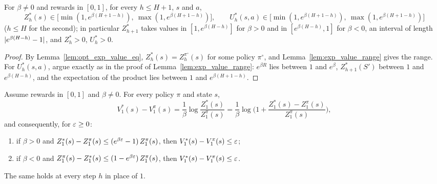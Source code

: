 \begin{lemma}\label{lem:opt_exp_value_range}
\leanok
{}
For $\beta \ne 0$ and rewards in $[0, 1]$, for every $h \le H + 1$, $s$ and $a$,
\[
  Z^*_h(s) \in \big[\min(1, e^{\beta(H + 1 - h)}),\ \max(1, e^{\beta(H + 1 - h)})\big],
  \qquad
  U^*_h(s, a) \in \big[\min(1, e^{\beta(H + 1 - h)}),\ \max(1, e^{\beta(H + 1 - h)})\big]
\]
($h \le H$ for the second); in particular $Z^*_{h+1}$ takes values in $[1, e^{\beta(H - h)}]$
for $\beta > 0$ and in $[e^{\beta(H - h)}, 1]$ for $\beta < 0$, an interval of length
$\lvert e^{\beta(H - h)} - 1 \rvert$, and $Z^*_h > 0$, $U^*_h > 0$.
\end{lemma}

\begin{proof}
\leanok
By Lemma~\ref{lem:opt_exp_value_eq}, $Z^*_h(s) = Z^{\pi^\circ}_h(s)$ for some policy $\pi^\circ$, and
Lemma~\ref{lem:exp_value_range} gives the range. For $U^*_h(s, a)$, argue exactly as in the proof
of Lemma~\ref{lem:exp_value_range}: $e^{\beta R}$ lies between $1$ and $e^{\beta}$, $Z^*_{h+1}(S')$
between $1$ and $e^{\beta(H - h)}$, and the expectation of the product lies between $1$ and
$e^{\beta(H + 1 - h)}$.
\end{proof}

\begin{lemma}\label{lem:value_gap_log}
\leanok
{}
Assume rewards in $[0, 1]$ and $\beta \ne 0$. For every policy $\pi$ and state $s$,
\[
  V^*_1(s) - V^\pi_1(s) = \frac1\beta \log \frac{Z^*_1(s)}{Z^\pi_1(s)}
  = \frac1\beta \log\Big(1 + \frac{Z^*_1(s) - Z^\pi_1(s)}{Z^\pi_1(s)}\Big) ,
\]
and consequently, for $\varepsilon \ge 0$:
\begin{enumerate}
  \item[(i)] if $\beta > 0$ and $Z^*_1(s) - Z^\pi_1(s) \le (e^{\beta\varepsilon} - 1)\, Z^\pi_1(s)$, then
        $V^*_1(s) - V^\pi_1(s) \le \varepsilon$;
  \item[(ii)] if $\beta < 0$ and $Z^\pi_1(s) - Z^*_1(s) \le (1 - e^{\beta\varepsilon})\, Z^\pi_1(s)$, then
        $V^*_1(s) - V^\pi_1(s) \le \varepsilon$.
\end{enumerate}
The same holds at every step $h$ in place of $1$.
\end{lemma}

